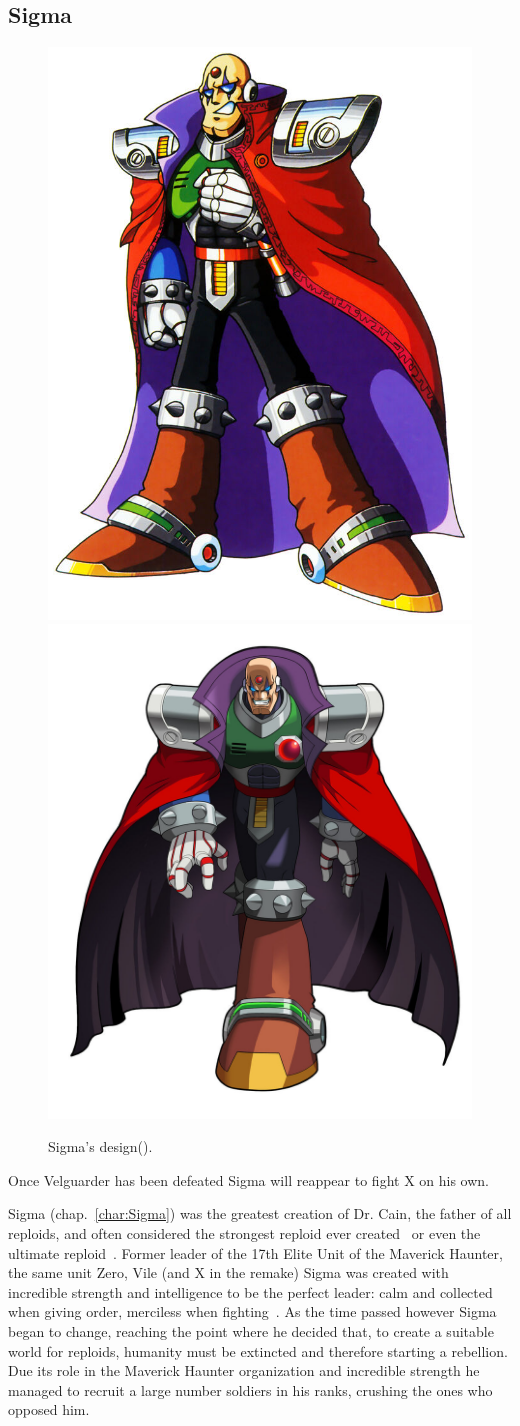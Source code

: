 \subsection{Sigma}\label{boss:Sigma_x1}
\begin{figure}[htp]
	\centering
	\includegraphics[width=0.4\linewidth]{figures/X1/Sigma_stages/Sigma.jpg}
	\includegraphics[width=0.5\linewidth]{figures/X1/Sigma_stages/MHXSigma.jpg}
	\caption{Sigma's design(\cite{book:MMX_Complete_art}).}
\end{figure}
Once Velguarder has been defeated Sigma will reappear to fight X on his own.

Sigma (chap.~\ref{char:Sigma}) was the greatest creation of Dr. Cain, the father of all reploids, and often considered the strongest reploid ever created~\cite{wayback:X_resources} or even the ultimate reploid~\cite{MHX:manual}. Former leader of the 17th Elite Unit of the Maverick Haunter, the same unit Zero, Vile (and X in the remake) Sigma was created with incredible strength and intelligence  to be the perfect leader: calm and collected when giving order, merciless when fighting~\cite{Xcoll1:Manual_X1}. As the time passed however Sigma began to change, reaching the point where he decided that, to create a suitable world for reploids, humanity must be extincted and therefore starting a rebellion. Due its role in the Maverick Haunter organization and incredible strength he managed to recruit a large number soldiers in his ranks, crushing the ones who opposed him. 

